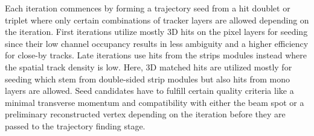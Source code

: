 
Each iteration commences by forming a trajectory seed from a hit doublet or triplet where only certain combinations of tracker layers are allowed depending on the iteration. First iterations utilize mostly 3D hits on the pixel layers for seeding since their low channel occupancy results in less ambiguity and a higher efficiency for close-by tracks. Late iterations use hits from the strips modules instead where the spatial track density is low. Here, 3D matched hits are utilized mostly for seeding which stem from double-sided strip modules but also hits from mono layers are allowed. Seed candidates have to fulfill certain quality criteria like a minimal transverse momentum and compatibility with either the beam spot or a preliminary reconstructed vertex depending on the iteration before they are passed to the trajectory finding stage.

